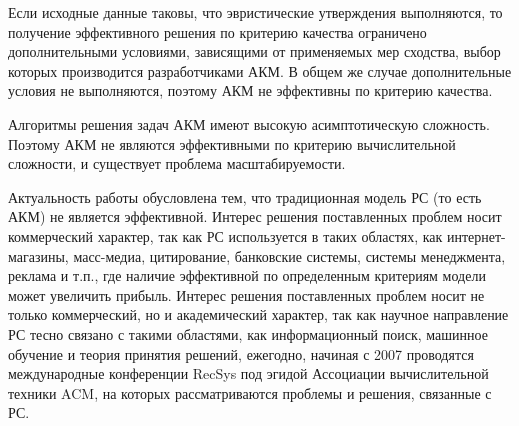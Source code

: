 
Если исходные данные таковы, что эвристические утверждения выполняются,
то получение эффективного решения по критерию качества
ограничено дополнительными условиями, зависящими от применяемых
мер сходства, выбор которых производится разработчиками АКМ.
В общем же случае дополнительные условия не выполняются, поэтому АКМ
не эффективны по критерию качества.

Алгоритмы решения задач АКМ имеют высокую асимптотическую сложность.
Поэтому АКМ не являются эффективными по критерию вычислительной сложности, и
существует проблема масштабируемости.

Актуальность работы обусловлена тем, что традиционная модель РС (то есть АКМ)
не является эффективной. Интерес решения
поставленных проблем носит коммерческий характер,
так как РС используется в таких областях, как интернет-магазины, масс-медиа,
цитирование, банковские системы, системы менеджмента, реклама и т.п.,
где наличие эффективной по определенным критериям модели может увеличить
прибыль.
Интерес решения поставленных проблем носит не только коммерческий, но и
академический характер, так как научное направление РС тесно связано с такими
областями, как информационный поиск, машинное обучение и теория принятия
решений, ежегодно, начиная с 2007 проводятся международные конференции RecSys
под эгидой Ассоциации вычислительной техники ACM, на которых рассматриваются
проблемы и решения, связанные с РС.


